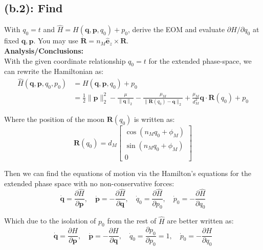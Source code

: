 \documentclass[titlepage]{article}
\begin{document}
\subsection*{(b.2): Find}

With $q_0=t$ and $\widehat{H}=H(\boldsymbol{q},\boldsymbol{p},q_0)+p_0$, derive the EOM and evaluate $\partial H/\partial q_0$ at fixed $\boldsymbol{q},\boldsymbol{p}$. You may use $\dot{\boldsymbol{R}}=n_M\hat{\boldsymbol{e}}_z\times\boldsymbol{R}$. \\

\textbf{Analysis/Conclusions:}\\

With the given coordinate relationship $q_0=t$ for the extended phase-space, we can rewrite the Hamiltonian as:
\begin{equation}
	\begin{split}
		\widehat{H}(\boldsymbol{q},\boldsymbol{p},q_0,p_0)&=H(\boldsymbol{q},\boldsymbol{p},q_0)+p_0 \\
		&=\frac{1}{2}\|\boldsymbol{p}\|_2^2-\frac{\mu}{\|\boldsymbol{q}\|_2}-\frac{\mu_M}{\|\boldsymbol{R}(q_0)-\boldsymbol{q}\|_2}+\frac{\mu_M}{d_M^3}\boldsymbol{q}\cdot\boldsymbol{R}(q_0)+p_0
	\end{split}
\end{equation}

Where the position of the moon $\boldsymbol{R}(q_0)$ is written as:
\begin{equation}
	\boldsymbol{R}(q_0)=d_M
	\begin{bmatrix}
		\cos(n_Mq_0+\phi_M) \\
		\sin(n_Mq_0+\phi_M) \\
		0
	\end{bmatrix}
\end{equation}

Then we can find the equations of motion via the Hamilton's equations for the extended phase space with no non-conservative forces:
\begin{equation}
	\dot{\boldsymbol{q}}=\frac{\partial\widehat{H}}{\partial\boldsymbol{p}},\quad\dot{\boldsymbol{p}}=-\frac{\partial\widehat{H}}{\partial\boldsymbol{q}},\quad\dot{q}_0=\frac{\partial\widehat{H}}{\partial p_0},\quad\dot{p}_0=-\frac{\partial\widehat{H}}{\partial q_0}
\end{equation}

Which due to the isolation of $p_0$ from the rest of $\widehat{H}$ are better written as:
\begin{equation}
	\dot{\boldsymbol{q}}=\frac{\partial H}{\partial\boldsymbol{p}},\quad\dot{\boldsymbol{p}}=-\frac{\partial H}{\partial\boldsymbol{q}},\quad\dot{q}_0=\frac{\partial p_0}{\partial p_0}=1,\quad\dot{p}_0=-\frac{\partial H}{\partial q_0}
\end{equation}
\end{document}
